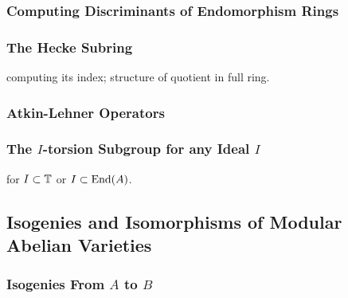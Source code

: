\documentclass{article}
\begin{document}
\subsubsection{Computing Discriminants of Endomorphism Rings}

\subsubsection{The Hecke Subring}
computing its index; structure of quotient in full ring.

\subsubsection{Atkin-Lehner Operators}

\subsubsection{The $I$-torsion Subgroup for any Ideal $I$}
for $I\subset \mathbb{T}$ or $I\subset\operatorname{End}(A)$.

\subsection{Isogenies and Isomorphisms of Modular Abelian Varieties}

\subsubsection{Isogenies From $A$ to $B$}
\end{document}
